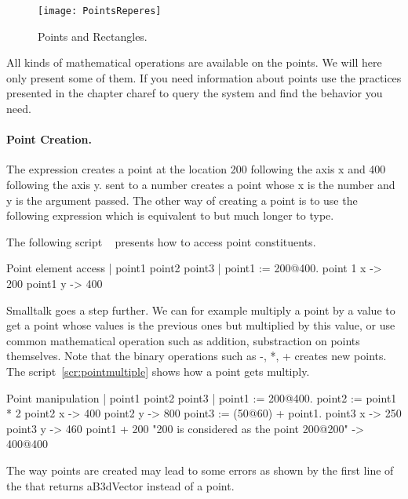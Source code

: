 
\begin{figure}
\begin{center}
\texttt{[image: PointsReperes]}
\caption{Points and Rectangles. \label{fig:PointsRepere}}
\end{center}
\end{figure}

All kinds of mathematical operations are available on the points. We will here only present some of them. If you need information about points use the practices presented in the chapter charef{} to query the system and find the behavior you need.

\paragraph{Point Creation.}
The expression  creates a point at the location 200 following the axis x and 400 following the axis y.  sent to a number creates a point whose x is the number and y is the argument passed. The other way of creating a point is to use the following expression  which is equivalent to  but much longer to type. 


The following script ~ presents how to access point constituents. 
\begin{scriptwithtitle}{Point element access}\label{scr:pointope}
| point1 point2 point3 |
point1 := 200@400.
point 1 x
-> 200
point1 y 
-> 400
\end{scriptwithtitle}

Smalltalk goes a step further. We can for example multiply a point by a value to get a point whose values is the previous ones but  multiplied by this value, or use common mathematical operation such as addition, substraction on points themselves. Note that the binary operations such as -, *, + creates new points.  The script~\ref{scr:pointmultiple}  shows how a point gets multiply. 

\begin{scriptwithtitle}{Point manipulation}\label{scr:pointmultiple}
| point1 point2 point3 |
point1 := 200@400.
point2 := point1 * 2
point2 x
-> 400
point2 y
-> 800
point3 := (50@60) + point1.
point3 x
-> 250
point3 y
-> 460
point1 + 200      "200 is considered as the point 200@200"
-> 400@400
\end{scriptwithtitle}

The way points are created may lead to some errors as shown by the first line of the  that returns aB3dVector instead of a point. 

